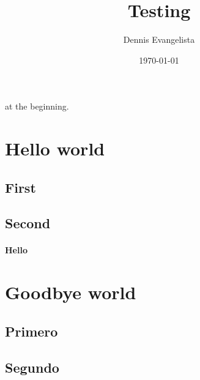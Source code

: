 \documentclass{article}
\title{Testing}
\author{Dennis Evangelista}
\date{\today}
\begin{document}
\maketitle

 at the beginning. %

\section{Hello world}
\lipsum[1][1]

\subsection{First}
\lipsum[1][2]

\subsection{Second}
\lipsum[1][3]

\paragraph{Hello} \lipsum[1][4]

\section{Goodbye world}
\lipsum[2][1]

\subsection{Primero}
\lipsum[2][2]

\subsection{Segundo}
\lipsum[2][3]

\begin{fullwidth}
\small\itshape\lipsum[1]
\end{fullwidth}
\end{document}
